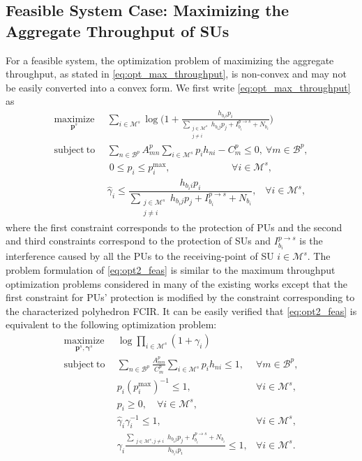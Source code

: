 \documentclass[journal,twoside]{IEEEtran}
\newcommand{\B}{\mathcal{B}}
\newcommand{\M}{\mathcal{M}}
\newcommand{\pimax}{p_i^{\mathrm{max}}}
\newcommand{\pbold}{\mathbf{p}}
\newcommand{\gammaihat}{\mathit{\widehat{\gamma}}_i}
\newcommand{\gammahat}{\mathit{\widehat{\gamma}}}
\newcommand{\gammabold}{\boldsymbol{\gamma}}
\newcommand{\hup}[2]{h_{#1 #2}}
\newcommand{\Nup}[1]{N_{#1}}
\begin{document}
\subsection{Feasible System Case: Maximizing the Aggregate Throughput of SUs} For a feasible system, the optimization problem of maximizing the aggregate throughput, as stated in \eqref{eq:opt_max_throughput}, is non-convex and may not be easily converted into a convex form.  We first write \eqref{eq:opt_max_throughput} as
\begin{align}
	\label{eq:opt2_feas}
		\underset{\pbold^s}{\mathrm{maximize}}& \ \  \sum_{i\in\M^s}{ \log \bigg( 1+ \frac	{\hup{b_i}{i} p_i}
		 						{  \sum\limits_{\substack{j\in\M^s\\ j \ne i}}{\!\!\hup{b_i}{j} p_j} + \!
		 						I_{b_i}^{p \rightarrow s} +
		 						  \Nup{b_i} \!
		 						} \bigg) }  \ \ \   \nonumber \\
		\mathrm{subject\ to} 
		& \ \ \sum\limits_{n\in\B^p} {A^p_{mn} \sum_{i\in\M^s} {p_i h_{ni}} } -C^p_m \leq 0 , \ \forall m\in\B^p,
	\nonumber \\
		& \ \ \ 0\leq p_i \leq \pimax, \hspace{75pt} \forall i\in\M^s,
	\nonumber \\	
		& \ \ \gammaihat \leq \dfrac	{\hup{b_i}{i} p_i}
 						{  \sum\limits_{\substack{j\in\M^s\\ j \ne i}}{\!\!\hup{b_i}{j} p_j} + \!
 						I_{b_i}^{p \rightarrow s} +
 						  \Nup{b_i} \!
 						}, \hspace{10pt} \forall i\in\M^s,
	\end{align}
	where the first constraint corresponds to the protection of PUs and the second and third constraints correspond to the protection of SUs and $I_{b_i}^{p \rightarrow s}$ is the interference caused by all the PUs to the receiving-point of SU $i\in\M^s$. 
	The problem formulation of \eqref{eq:opt2_feas} is similar to the maximum throughput optimization problems considered in many of the existing works except that the first constraint for PUs' protection is modified by the constraint corresponding to the characterized polyhedron FCIR. It can be easily verified that \eqref{eq:opt2_feas} is equivalent to the following optimization problem:
	\begin{align}
	\label{eq:opt3_feas}
		\underset{\pbold^s,\gammabold^s}{\mathrm{maximize}}& \ \ \log \prod_{i\in\M^s}{  ( 1+ \gamma_i ) }  \ \ \   \nonumber \\
		\mathrm{subject\ to} 
		& \ \ \sum\limits_{n\in\B^p} { \frac{A^p_{mn}}{C^p_m} \sum_{i\in\M^s} {p_i h_{ni}} } \leq 1, &\forall m\in\B^p,
	\nonumber \\
		& \ \  p_i (p_i^{\mathrm{max}})^{-1} \leq 1, & \forall i\in\M^s, 
	\nonumber \\
		& \ \ p_i \geq 0, \quad \forall i\in\M^s, 
	\nonumber \\
		& \ \ \gammahat_i \gamma_i^{-1}  \leq 1, \quad & \forall i\in\M^s, 
	\nonumber \\	
		& \ \ \gamma_i
		\frac{\sum\limits_{\substack{j\in\M^s, j \ne i}}{\!\!\hup{b_i}{j} p_j} + \!
				 						I_{b_i}^{p \rightarrow s} +
				 						  \Nup{b_i}}
		{\hup{b_i}{i} p_i}
		\leq 1
 						, & \forall i\in\M^s. 
	\end{align}
\end{document}
